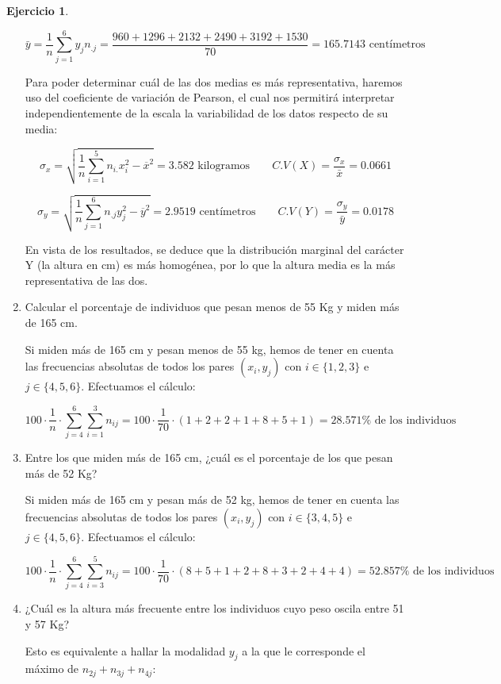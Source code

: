 \documentclass[a4paper, 12pt]{article}
\theoremstyle{definition}
\newtheorem{ej}{Ejercicio}
\begin{document}
\begin{ej}
\begin{enumerate}[label=\alph*)]
\[
	\bar{y} = \frac{1}{n} \sum_{j=1}^{6} y_j n_{.j} = \frac{960+1296+2132+2490+3192+1530}{70} = 165.7143 \text{ centímetros} 
\]

Para poder determinar cuál de las dos medias es más representativa, haremos uso del coeficiente de variación de Pearson, el cual nos permitirá interpretar independientemente de la escala la variabilidad de los datos respecto de su media:

\[
	\sigma_x = \sqrt{\frac{1}{n} \sum_{i=1}^{5} n_{i.} x_i^2 - \overline{x}^2} = 3.582 \text{ kilogramos} \qquad C.V(X) = \frac{\sigma_x}{\bar{x}} = 0.0661
\]

\[
	\sigma_y = \sqrt{\frac{1}{n} \sum_{j=1}^{6} n_{.j} y_j^2 - \overline{y}^2} = 2.9519 \text{ centímetros} \qquad C.V(Y) = \frac{\sigma_y}{\bar{y}} = 0.0178
\]

En vista de los resultados, se deduce que la distribución marginal del carácter Y (la altura en cm) es más homogénea, por lo que la altura media es la más representativa de las dos.

\newpage

 \item Calcular el porcentaje de individuos que pesan menos de 55 Kg y miden más de 165 cm.
 
Si miden más de 165 cm y pesan menos de 55 kg, hemos de tener en cuenta las frecuencias absolutas de todos los pares $(x_i,y_j)$ con $i \in \{1,2,3\}$ e $j \in \{4,5,6\}$. Efectuamos el cálculo:

\[
	100 \cdot \frac{1}{n} \cdot \sum_{j=4}^{6}\sum_{i=1}^{3}n_{ij} = 100 \cdot \frac{1}{70} \cdot (1+2+2+1+8+5+1) = 28.571\% \text{ de los individuos} 
\]

\item Entre los que miden más de 165 cm, ¿cuál es el porcentaje de los que pesan más de 52 Kg?

Si miden más de 165 cm y pesan más de 52 kg, hemos de tener en cuenta las frecuencias absolutas de todos los pares $(x_i,y_j)$ con $i \in \{3,4,5\}$ e $j \in \{4,5,6\}$. Efectuamos el cálculo:

\[
	100 \cdot \frac{1}{n} \cdot \sum_{j=4}^{6}\sum_{i=3}^{5}n_{ij} = 100 \cdot \frac{1}{70} \cdot (8+5+1+2+8+3+2+4+4) = 52.857\% \text{ de los individuos} 
\]

\item ¿Cuál es la altura más frecuente entre los individuos cuyo peso oscila entre 51 y 57 Kg?

Esto es equivalente a hallar la modalidad $y_j$ a la que le corresponde el máximo de $n_{2j}+n_{3j}+n_{4j}$:


\end{enumerate}
\end{ej}
\end{document}
